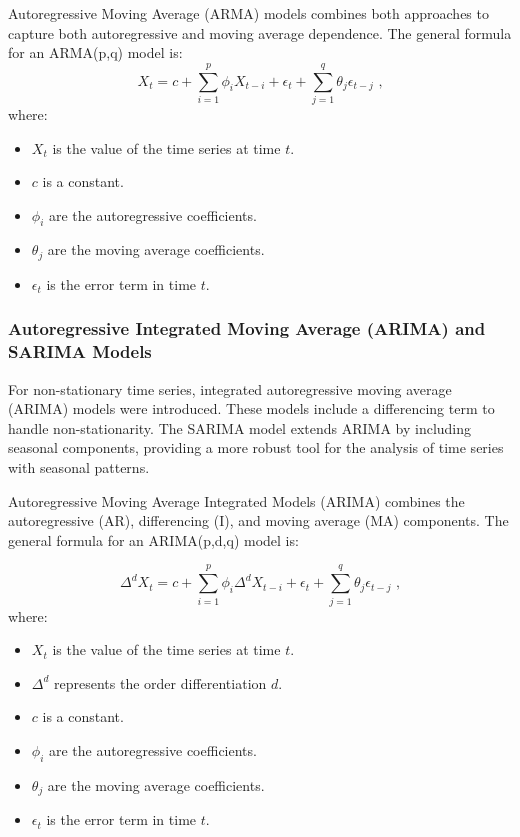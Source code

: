 Autoregressive Moving Average (ARMA) models combines both approaches to capture both autoregressive and moving average dependence. The general formula for an ARMA(p,q) model is:
\begin{equation}
X_t = c + \sum_{i=1}^{p} \phi_i X_{t-i} + \epsilon_t + \sum_{j=1}^{q} \theta_j \epsilon_{t-j} \text{ ,}
\end{equation}where:
\begin{itemize}
    \item \( X_t \) is the value of the time series at time \( t \).
    \item \( c \) is a constant.
    \item \( \phi_i \) are the autoregressive coefficients.
    \item \( \theta_j \) are the moving average coefficients.
    \item \( \epsilon_t \) is the error term in time \( t \).
\end{itemize}
\vspace{10pt}

\subsubsection{Autoregressive Integrated Moving Average (ARIMA) and SARIMA Models}

For non-stationary time series, integrated autoregressive moving average (ARIMA) models were introduced. These models include a differencing term to handle non-stationarity. The SARIMA model extends ARIMA by including seasonal components, providing a more robust tool for the analysis of time series with seasonal patterns.

Autoregressive Moving Average Integrated Models (ARIMA) combines the autoregressive (AR), differencing (I), and moving average (MA) components. The general formula for an ARIMA(p,d,q) model is:

\begin{equation}
\Delta^d X_t = c + \sum_{i=1}^{p} \phi_i \Delta^d X_{t-i} + \epsilon_t + \sum_{j=1}^{q} \theta_j \epsilon_{t-j} \text{ ,}
\end{equation}where:
\begin{itemize}
    \item \( X_t \) is the value of the time series at time \( t \).
    \item \( \Delta^d \) represents the order differentiation \( d \).
    \item \( c \) is a constant.
    \item \( \phi_i \) are the autoregressive coefficients.
    \item \( \theta_j \) are the moving average coefficients.
    \item \( \epsilon_t \) is the error term in time \( t \).
\end{itemize}

